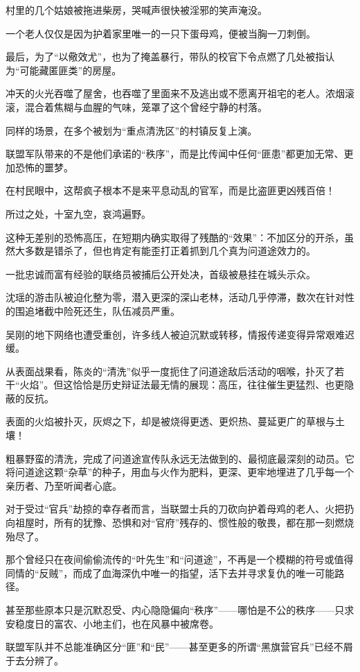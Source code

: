 村里的几个姑娘被拖进柴房，哭喊声很快被淫邪的笑声淹没。

一个老人仅仅是因为护着家里唯一的一只下蛋母鸡，便被当胸一刀刺倒。

最后，为了“以儆效尤”，也为了掩盖暴行，带队的校官下令点燃了几处被指认为“可能藏匿匪类”的房屋。

冲天的火光吞噬了屋舍，也吞噬了里面来不及逃出或不愿离开祖宅的老人。浓烟滚滚，混合着焦糊与血腥的气味，笼罩了这个曾经宁静的村落。

同样的场景，在多个被划为“重点清洗区”的村镇反复上演。

联盟军队带来的不是他们承诺的“秩序”，而是比传闻中任何“匪患”都更加无常、更加恐怖的噩梦。

在村民眼中，这帮疯子根本不是来平息动乱的官军，而是比盗匪更凶残百倍！

所过之处，十室九空，哀鸿遍野。

这种无差别的恐怖高压，在短期内确实取得了残酷的“效果”：不加区分的开杀，虽然大多数是错杀了，但也肯定有能歪打正着抓到几个真为问道途效力的。

一批忠诚而富有经验的联络员被捕后公开处决，首级被悬挂在城头示众。

沈瑶的游击队被迫化整为零，潜入更深的深山老林，活动几乎停滞，数次在针对性的围追堵截中险死还生，队伍减员严重。

吴刚的地下网络也遭受重创，许多线人被迫沉默或转移，情报传递变得异常艰难迟缓。

从表面战果看，陈炎的“清洗”似乎一度扼住了问道途敌后活动的咽喉，扑灭了若干“火焰”。但这恰恰是历史辩证法最无情的展现：高压，往往催生更猛烈、也更隐蔽的反抗。

表面的火焰被扑灭，灰烬之下，却是被烧得更透、更炽热、蔓延更广的草根与土壤！

粗暴野蛮的清洗，完成了问道途宣传队永远无法做到的、最彻底最深刻的动员。它将问道途这颗“杂草”的种子，用血与火作为肥料，更深、更牢地埋进了几乎每一个亲历者、乃至听闻者心底。

对于受过“官兵”劫掠的幸存者而言，当联盟士兵的刀砍向护着母鸡的老人、火把扔向祖屋时，所有的犹豫、恐惧和对“官府”残存的、惯性般的敬畏，都在那一刻燃烧殆尽了。

那个曾经只在夜间偷偷流传的“叶先生”和“问道途”，不再是一个模糊的符号或值得同情的“反贼”，而成了血海深仇中唯一的指望，活下去并寻求复仇的唯一可能路径。

甚至那些原本只是沉默忍受、内心隐隐偏向“秩序”——哪怕是不公的秩序——只求安稳度日的富农、小地主们，也在风暴中被席卷。

联盟军队并不总能准确区分“匪”和“民”——甚至更多的所谓“黑旗营官兵”已经不屑于去分辨了。

